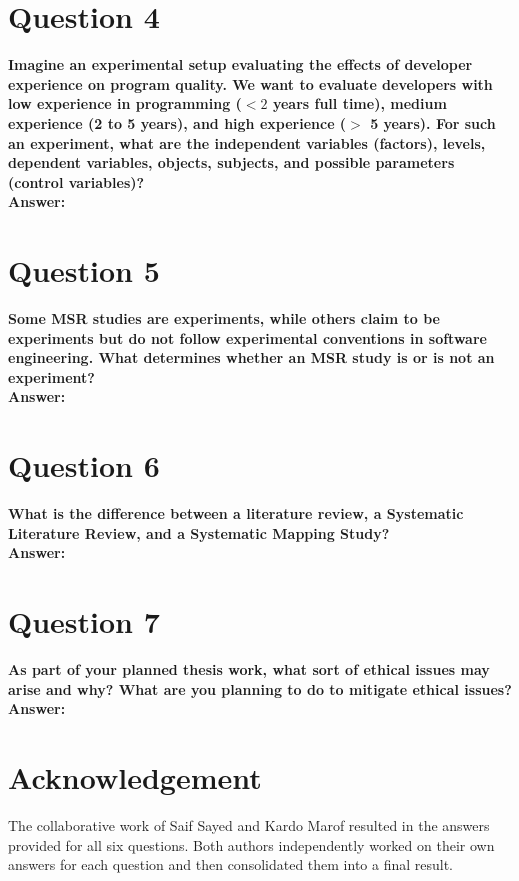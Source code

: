 \documentclass[conference]{IEEEtran}
\begin{document}
\section{Question 4}

\textbf{Imagine an experimental setup evaluating the effects of developer experience on program quality. We want to evaluate developers with low experience in programming ($<2$ years full time), medium experience (2 to 5 years), and high experience ($>$ 5 years). For such an experiment, what are the independent variables (factors), levels, dependent variables, objects, subjects, and possible parameters (control variables)?}\\

\textbf{Answer:}

\section{Question 5}

\textbf{Some MSR studies are experiments, while others claim to be experiments but do not follow experimental conventions in software engineering. What determines whether an MSR study is or is not an experiment?}\\

\textbf{Answer:}

\section{Question 6}

\textbf{What is the difference between a literature review, a Systematic Literature Review, and a Systematic Mapping Study?}\\

\textbf{Answer:}

\section{Question 7}

\textbf{As part of your planned thesis work, what sort of ethical issues may arise and why? What are you planning to do to mitigate ethical issues?}\\

\textbf{Answer:} 

\section{Acknowledgement}
The collaborative work of Saif Sayed and Kardo Marof resulted in the answers provided for all six questions. Both authors independently worked on their own answers for each question and then consolidated them into a final result.
\end{document}
